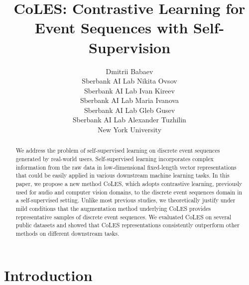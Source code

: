 \documentclass{article}
\title{CoLES: Contrastive Learning for Event Sequences with Self-Supervision}
\author{
Dmitrii Babaev \\
Sberbank AI Lab
\And
Nikita Ovsov \\
Sberbank AI Lab
\And
Ivan Kireev \\
Sberbank AI Lab
\And
Maria Ivanova \\
Sberbank AI Lab
\And
Gleb Gusev \\
Sberbank AI Lab
\And
Alexander Tuzhilin \\
New York University
}
\begin{document}
\maketitle

\begin{abstract}

We address the problem of self-supervised learning on discrete event sequences generated by real-world users. Self-supervised learning incorporates complex information from the raw data in low-dimensional fixed-length vector representations that could be easily applied in various downstream machine learning tasks. In this paper, we propose a new method CoLES, which adopts contrastive learning, previously used for audio and computer vision domains, to the discrete event sequences domain in a self-supervised setting. Unlike most previous studies, we theoretically justify under mild conditions that the augmentation method underlying CoLES provides representative samples of discrete event sequences. We evaluated CoLES on several public datasets and showed that CoLES representations  
consistently outperform other methods on different downstream tasks.

\end{abstract}

\section{Introduction} \label{sec-intro}

\end{document}
